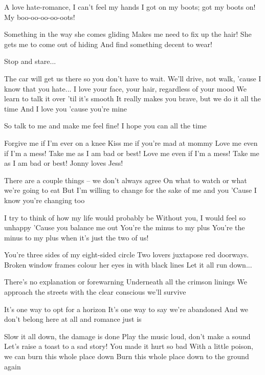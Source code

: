 A love hate-romance, I can't feel my hands
I got on my boots; got my boots on!
My boo-oo-oo-oo-oots!

Something in the way she comes gliding
Makes me need to fix up the hair!
She gets me to come out of hiding
And find something decent to wear!

Stop and stare...


The car will get us there so you don't have to wait.
We'll drive, not walk, 'cause I know that you hate...
I love your face, your hair, regardless of your mood
We learn to talk it over 'til it's smooth
It really makes you brave, but we do it all the time
And I love you 'cause you're mine

So talk to me and make me feel fine!
I hope you can all the time

Forgive me if I'm ever on a knee
Kiss me if you're mad at mommy
Love me even if I'm a mess!
Take me as I am bad or best!
Love me even if I'm a mess! Take me as I am bad or best!
Jonny loves Jess!

There are a couple things -- we don't always agree
On what to watch or what we're going to eat
But I'm willing to change for the sake of me and you
'Cause I know you're changing too

I try to think of how my life would probably be
Without you, I would feel so unhappy
'Cause you balance me out
You're the minus to my plus
You're the minus to my plus when it's just the two of us!


You're three sides of my eight-sided circle
Two lovers juxtapose red doorways.
Broken window frames colour her eyes in with black lines
Let it all run down...

There's no explanation or forewarning
Underneath all the crimson linings
We approach the streets with the clear conscious we'll survive

It's one way to opt for a horizon
It's one way to say we're abandoned
And we don't belong here at all
and romance just is

Slow it all down, the damage is done
Play the music loud, don't make a sound
Let's raise a toast to a sad story!
You made it hurt so bad
With a little poison, we can burn this whole place down
Burn this whole place down to the ground again


